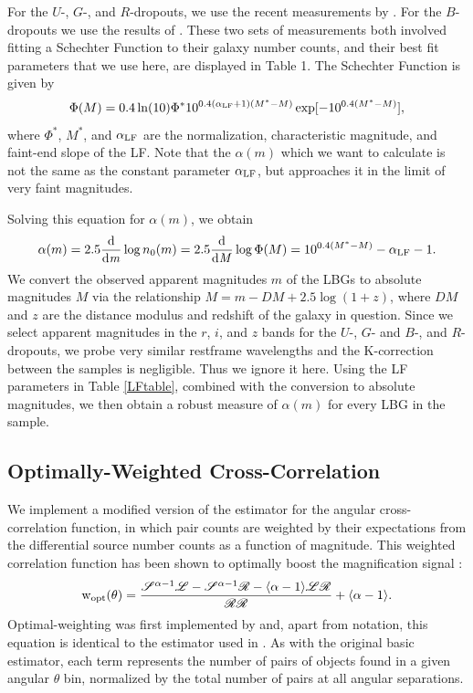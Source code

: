 For the $U$-, $G$-, and $R$-dropouts, we use the recent measurements by \citet{vanderBurg10}. For the $B$-dropouts we use the results of \citet{Sawicki06}. These two sets of measurements both involved fitting a Schechter Function \citep{Schechter76} to their galaxy number counts, and their best fit parameters that we use here, are displayed in Table 1.  The Schechter Function is given by
\begin{equation}
\Phi(M)=0.4\ln(10)\Phi^\ast10^{0.4(\alpha_{\rm LF}+1)(M^\ast-M)} \exp [-10^{0.4(M^\ast-M)}],
\end{equation}
where $\Phi^\ast$, $M^\ast$, and $\alpha_{\rm LF}$ are the normalization, characteristic magnitude, and faint-end slope of the \ac{LF}.  Note that the $\alpha(m)$ which we want to calculate is not the same as the constant parameter $\alpha_{\rm LF}$, but approaches it in the limit of very faint magnitudes.

Solving this equation for $\alpha(m)$, we obtain
\begin{equation}
\alpha(m) = 2.5 \frac{\mathrm d}{\mathrm d \it m} \log n_0(m)= 2.5 \frac{\mathrm d}{\mathrm d \it M} \log \Phi(M) = 10^{0.4(M^\ast-M)}-\alpha_{\rm LF}-1.
\end{equation}
We convert the observed apparent magnitudes $m$ of the \ac{LBG}s to absolute magnitudes $M$ via the relationship $M = m - DM + 2.5 \log (1+z)$, where $DM$ and $z$ are the distance modulus and redshift of the galaxy in question. Since we select apparent magnitudes in the $r$, $i$, and $z$ bands for the $U$-, $G$- and $B$-, and $R$-dropouts, we probe very similar restframe wavelengths and the K-correction between the samples is negligible.  Thus we ignore it here. Using the \ac{LF} parameters in Table \ref{LFtable}, combined with the conversion to absolute magnitudes, we then obtain a robust measure of $\alpha(m)$ for every \ac{LBG} in the sample. 

\subsection{Optimally-Weighted Cross-Correlation}
We implement a modified version of the \citet{LandySzalay93} estimator for the angular cross-correlation function, in which pair counts are weighted by their expectations from the differential source number counts as a function of magnitude.  This weighted correlation function has been shown to optimally boost the magnification signal \citep{Menard03}:    
\begin{equation}
\mathrm{w}_{\rm opt}(\theta)=\frac{\mathscr{S}^{\alpha-1} \mathscr{L} - \mathscr{S}^{\alpha-1} \mathscr{R} - \langle \alpha-1 \rangle \mathscr{L}\mathscr{R}}{\mathscr{R}\mathscr{R}} + \langle \alpha-1 \rangle .
\end{equation}
Optimal-weighting was first implemented by \citet{Scranton05} and, apart from notation, this equation is identical to the estimator used in \citet{Hildebrandt09b}.  As with the original basic estimator, each term represents the number of pairs of objects found in a given angular $\theta$ bin, normalized by the total number of pairs at all angular separations.  

